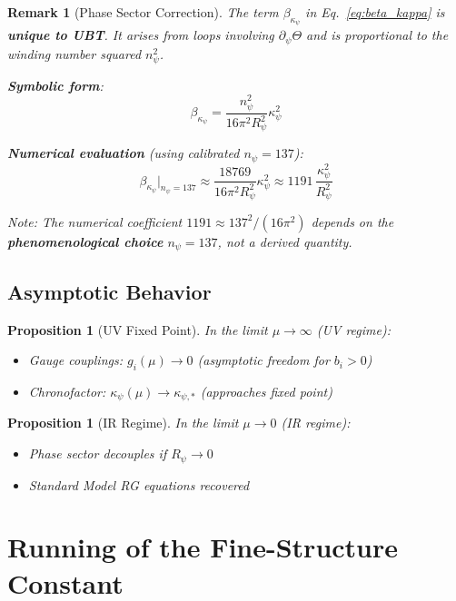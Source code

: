 \documentclass[12pt]{article}
\newtheorem{proposition}[definition]{Proposition}
\newtheorem{remark}[definition]{Remark}
\begin{document}
\begin{remark}[Phase Sector Correction]
The term $\beta_{\kappa_\psi}$ in Eq.~\eqref{eq:beta_kappa} is \textbf{unique to UBT}. It arises from loops involving $\partial_\psi \Theta$ and is proportional to the winding number squared $n_\psi^2$. 

\textbf{Symbolic form}:
\begin{equation}
\beta_{\kappa_\psi} = \frac{n_\psi^2}{16\pi^2 R_\psi^2} \kappa_\psi^2
\label{eq:beta_kappa_symbolic}
\end{equation}

\textbf{Numerical evaluation} (using calibrated $n_\psi = 137$):
\begin{equation}
\beta_{\kappa_\psi} \bigg|_{n_\psi=137} \approx \frac{18769}{16\pi^2 R_\psi^2} \kappa_\psi^2 \approx 1191 \, \frac{\kappa_\psi^2}{R_\psi^2}
\end{equation}

Note: The numerical coefficient $1191 \approx 137^2 / (16\pi^2)$ depends on the \textbf{phenomenological choice} $n_\psi = 137$, not a derived quantity.
\end{remark}

\subsection{Asymptotic Behavior}

\begin{proposition}[UV Fixed Point]
In the limit $\mu \to \infty$ (UV regime):
\begin{itemize}
    \item Gauge couplings: $g_i(\mu) \to 0$ (asymptotic freedom for $b_i > 0$)
    \item Chronofactor: $\kappa_\psi(\mu) \to \kappa_{\psi,*}$ (approaches fixed point)
\end{itemize}
\end{proposition}

\begin{proposition}[IR Regime]
In the limit $\mu \to 0$ (IR regime):
\begin{itemize}
    \item Phase sector decouples if $R_\psi \to 0$
    \item Standard Model RG equations recovered
\end{itemize}
\end{proposition}

\section{Running of the Fine-Structure Constant}
\label{sec:alpha_running}
\end{document}
